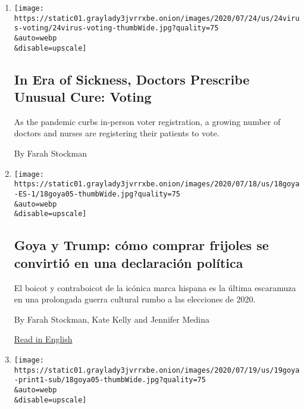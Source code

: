 \begin{enumerate}
\def\labelenumi{\arabic{enumi}.}
\item
  \href{/2020/07/25/us/in-era-of-sickness-doctors-prescribe-unusual-cure-voting.html}{}

  \texttt{[image: https://static01.graylady3jvrrxbe.onion/images/2020/07/24/us/24virus-voting/24virus-voting-thumbWide.jpg?quality=75\\\&auto=webp\\\&disable=upscale]}

  \hypertarget{in-era-of-sickness-doctors-prescribe-unusual-cure-voting}{%
  \subsection{In Era of Sickness, Doctors Prescribe Unusual Cure:
  Voting}\label{in-era-of-sickness-doctors-prescribe-unusual-cure-voting}}

  As the pandemic curbs in-person voter registration, a growing number
  of doctors and nurses are registering their patients to vote.

  By Farah Stockman
\item
  \href{/es/2020/07/19/espanol/goya-boicot-trump.html}{}

  \texttt{[image: https://static01.graylady3jvrrxbe.onion/images/2020/07/18/us/18goya-ES-1/18goya05-thumbWide.jpg?quality=75\\\&auto=webp\\\&disable=upscale]}

  \hypertarget{goya-y-trump-cuxf3mo-comprar-frijoles-se-convirtiuxf3-en-una-declaraciuxf3n-poluxedtica}{%
  \subsection{Goya y Trump: cómo comprar frijoles se convirtió en una
  declaración
  política}\label{goya-y-trump-cuxf3mo-comprar-frijoles-se-convirtiuxf3-en-una-declaraciuxf3n-poluxedtica}}

  El boicot y contraboicot de la icónica marca hispana es la última
  escaramuza en una prolongada guerra cultural rumbo a las elecciones de
  2020.

  By Farah Stockman, Kate Kelly and Jennifer Medina

  \href{https://www.nytimes3xbfgragh.onion/2020/07/19/us/goya-trump-hispanic-vote.html}{Read
  in English}
\item
  \href{/2020/07/19/us/goya-trump-hispanic-vote.html}{}

  \texttt{[image: https://static01.graylady3jvrrxbe.onion/images/2020/07/19/us/19goya-print1-sub/18goya05-thumbWide.jpg?quality=75\\\&auto=webp\\\&disable=upscale]}


\end{enumerate}
